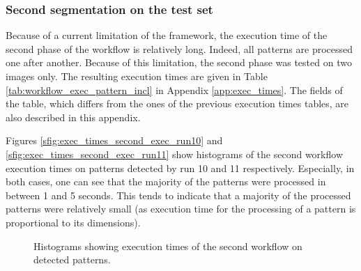 \subsubsection{Second segmentation on the test set}
\label{sssec:perf_third_test}

Because of a current limitation of the framework, the execution time of the second phase of the workflow is relatively long. Indeed, all patterns are processed one after another. Because of this limitation, the second phase was tested on two images only. The resulting execution times are given in Table \ref{tab:workflow_exec_pattern_incl} in Appendix \ref{app:exec_times}. The fields of the table, which differs from the ones of the previous execution times tables, are also described in this appendix.

Figures \ref{sfig:exec_times_second_exec_run10} and \ref{sfig:exec_times_second_exec_run11} show histograms of the second workflow execution times on patterns detected by run 10 and 11 respectively. Especially, in both cases, one can see that the majority of the patterns were processed in between 1 and 5 seconds. This tends to indicate that a majority of the processed patterns were relatively small (as execution time for the processing of a pattern is proportional to its dimensions). 

\begin{figure}
	\center
	\caption{Histograms showing execution times of the second workflow on detected patterns.}
\end{figure}

